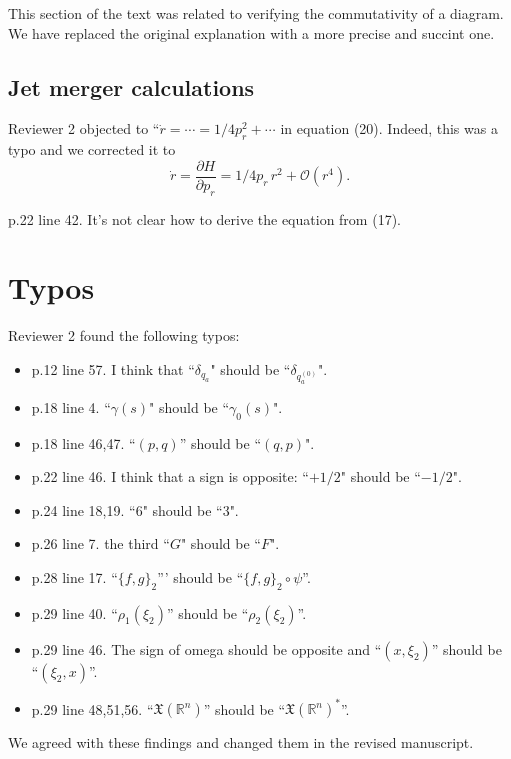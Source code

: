 \documentclass{article}
\begin{document}
This section of the text was related to verifying the commutativity of a diagram.  We have replaced the original explanation with a more precise and succint one.

\subsection{Jet merger calculations}
Reviewer 2 objected to ``$\dot{r} = \cdots = 1/4 p_r^2 + \cdots$ in
equation (20). Indeed, this was a typo and we corrected it to
\begin{equation*}
  \dot{r} = \frac{\partial H}{\partial p_r} = 1/4 p_r\,r^2 + \mathcal{O}(r^4).
\end{equation*}

p.22 line 42. It's not clear how to derive the equation from (17). 
\\

\section{Typos}
Reviewer 2 found the following typos:
\begin{itemize}
 \item p.12 line 57. I think that ``$\delta_{q_a}$" should be ``$\delta_{q_a^{(0)}}$". 
\item p.18 line 4. ``$\gamma(s)$" should be ``$\gamma_0(s)$". 
\item p.18 line 46,47. ``$(p, q)$'' should be ``$(q, p)$". 
\item p.22 line 46. I think that a sign is opposite: ``$+ 1/2$" should be ``$-1/2$". 
\item p.24 line 18,19. ``$6$" should be ``$3$". 
\item p.26 line 7. the third ``$G$" should be ``$F$".  
\item p.28 line 17. ``$\{f, g \}_2$''' should be ``$\{f, g \}_2 \circ \psi$''. 
\item p.29 line 40. ``$\rho_1(\xi_2)$'' should be ``$\rho_2(\xi_2)$''. 
\item p.29 line 46. The sign of omega should be opposite and ``$(x, \xi_2)$'' 
should be ``$(\xi_2, x)$''. 
\\
\item p.29 line 48,51,56. 
``$\mathfrak{X}(\mathbb{R}^n)$'' should be 
``$\mathfrak{X}(\mathbb{R}^n)^*$''. 
\end{itemize}

We agreed with these findings and changed them in the revised manuscript.
\end{document}
